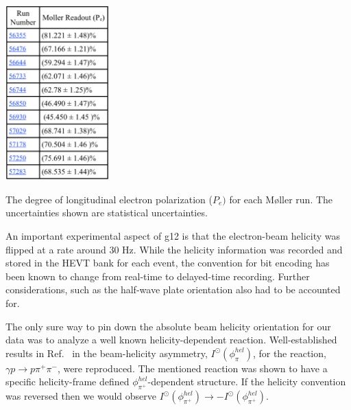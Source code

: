 \begin{table}[htpb]
\begin{center}
 \includegraphics[width=0.3\textwidth]{figures/calib/pol/moltable.eps}
  \caption{The degree of longitudinal electron polarization ($P_e)$ for each M{\o}ller run. The uncertainties shown are statistical uncertainties. }
  \label{moltable}
  \end{center}
\end{table}

An important experimental aspect of g12 is that the electron-beam helicity was flipped at a rate around 30 Hz. While the helicity information was recorded and stored in the HEVT bank for each event, the convention for bit encoding has been known to change from real-time to delayed-time recording. Further considerations, such as the half-wave plate orientation also had to be accounted for.

The only sure way to pin down the absolute beam helicity orientation for our data was to analyze a well known helicity-dependent reaction. Well-established results in Ref.~\cite{Io} in the beam-helicity asymmetry, $I^\odot(\phi^{hel}_\pi)$, for the reaction, $\gamma p \to p \pi^+ \pi^-$, were reproduced.  The mentioned reaction was shown to have a specific helicity-frame defined $\phi^{hel}_{\pi^+}$-dependent structure.  If the helicity convention was reversed then we would observe $I^\odot(\phi^{hel}_{\pi^+}) \to -I^\odot(\phi^{hel}_{\pi^+})$. 

